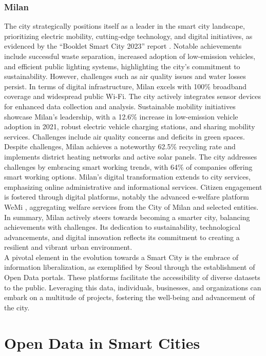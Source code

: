 \subsubsection{Milan} 
The city strategically positions itself as a leader in the smart city landscape, prioritizing electric mobility, cutting-edge technology, and digital initiatives, as evidenced by the ``Booklet Smart City 2023'' report \cite{SmartCity2023}. Notable achievements include successful waste separation, increased adoption of low-emission vehicles, and efficient public lighting systems, highlighting the city's commitment to sustainability. However, challenges such as air quality issues and water losses persist.
In terms of digital infrastructure, Milan excels with 100\% broadband coverage and widespread public Wi-Fi. The city actively integrates sensor devices for enhanced data collection and analysis. Sustainable mobility initiatives showcase Milan's leadership, with a 12.6\% increase in low-emission vehicle adoption in 2021, robust electric vehicle charging stations, and sharing mobility services. Challenges include air quality concerns and deficits in green spaces.
Despite challenges, Milan achieves a noteworthy 62.5\% recycling rate and implements district heating networks and active solar panels. The city addresses challenges by embracing smart working trends, with 64\% of companies offering smart working options. Milan's digital transformation extends to city services, emphasizing online administrative and informational services. Citizen engagement is fostered through digital platforms, notably the advanced e-welfare platform WeMi \cite{WeMiWebsite}, aggregating welfare services from the City of Milan and selected entities.
In summary, Milan actively steers towards becoming a smarter city, balancing achievements with challenges. Its dedication to sustainability, technological advancements, and digital innovation reflects its commitment to creating a resilient and vibrant urban environment.\\

A pivotal element in the evolution towards a Smart City is the embrace of information liberalization, as exemplified by Seoul through the establishment of Open Data portals. These platforms facilitate the accessibility of diverse datasets to the public. Leveraging this data, individuals, businesses, and organizations can embark on a multitude of projects, fostering the well-being and advancement of the city.

\section{Open Data in Smart Cities}

